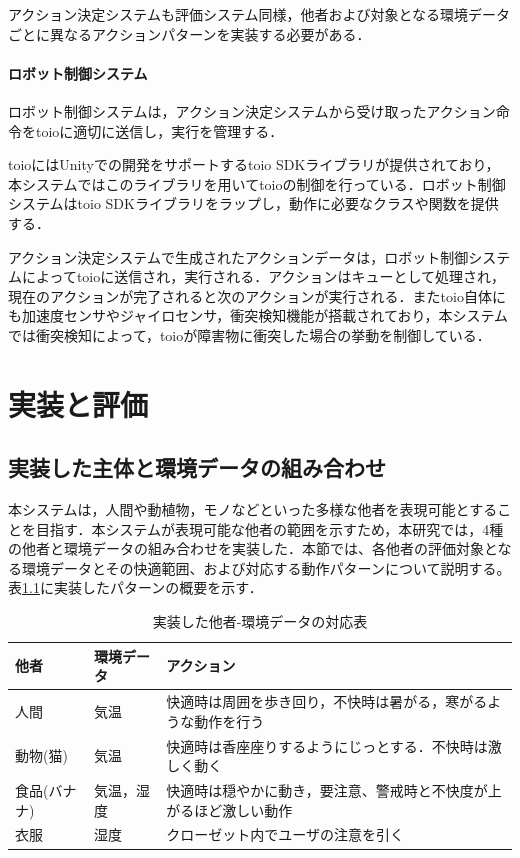 \documentclass{cuxarticle}
\begin{document}
アクション決定システムも評価システム同様，他者および対象となる環境データごとに異なるアクションパターンを実装する必要がある．

\subsubsection{ロボット制御システム}
ロボット制御システムは，アクション決定システムから受け取ったアクション命令をtoioに適切に送信し，実行を管理する．

toioにはUnityでの開発をサポートするtoio SDKライブラリが提供されており，本システムではこのライブラリを用いてtoioの制御を行っている．ロボット制御システムはtoio SDKライブラリをラップし，動作に必要なクラスや関数を提供する．

アクション決定システムで生成されたアクションデータは，ロボット制御システムによってtoioに送信され，実行される．アクションはキューとして処理され，現在のアクションが完了されると次のアクションが実行される．またtoio自体にも加速度センサやジャイロセンサ，衝突検知機能が搭載されており，本システムでは衝突検知によって，toioが障害物に衝突した場合の挙動を制御している．

\chapter{実装と評価}

\section{実装した主体と環境データの組み合わせ}
本システムは，人間や動植物，モノなどといった多様な他者を表現可能とすることを目指す．本システムが表現可能な他者の範囲を示すため，本研究では，4種の他者と環境データの組み合わせを実装した．本節では、各他者の評価対象となる環境データとその快適範囲、および対応する動作パターンについて説明する。表\ref{table:entities}に実装したパターンの概要を示す．

\begin{table}[htbp]
  \caption{実装した他者-環境データの対応表}
  \label{table:entities}
  \centering
  \begin{tabular}{|l|l|l|}
    \hline
    他者 & 環境データ & アクション \\
    \hline
    人間 & 気温 &  快適時は周囲を歩き回り，不快時は暑がる，寒がるような動作を行う \\
    \hline
    動物(猫) & 気温 & 快適時は香座座りするようにじっとする．不快時は激しく動く \\
    \hline
    食品(バナナ) & 気温，湿度 & 快適時は穏やかに動き，要注意、警戒時と不快度が上がるほど激しい動作 \\
    \hline
    衣服 & 湿度 & クローゼット内でユーザの注意を引く \\
    \hline
  \end{tabular}
\end{table}
\end{document}
